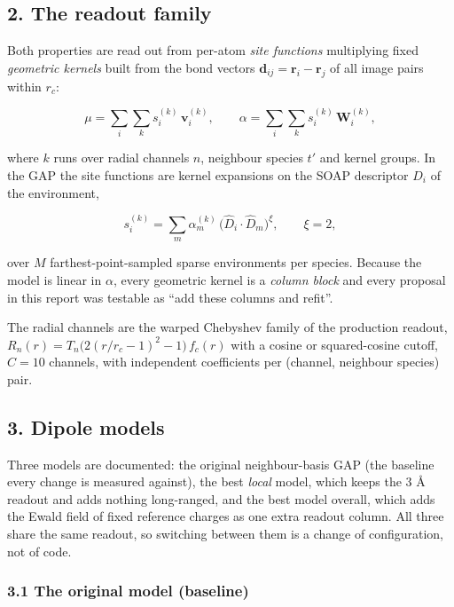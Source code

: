 \documentclass[
  10pt,
]{article}
\begin{document}
\subsection{2. The readout family}\label{the-readout-family}

Both properties are read out from per-atom \emph{site functions} multiplying fixed \emph{geometric
kernels} built from the bond vectors \(\mathbf d_{ij} = \mathbf r_i-\mathbf r_j\) of all image pairs
within \(r_c\):

\[
\mu = \sum_i \sum_k s^{(k)}_i\, \mathbf v^{(k)}_i, \qquad
\alpha = \sum_i \sum_k s^{(k)}_i\, \mathbf W^{(k)}_i ,
\]

where \(k\) runs over radial channels \(n\), neighbour species \(t'\) and kernel groups. In the GAP
the site functions are kernel expansions on the SOAP descriptor \(D_i\) of the environment,

\[
s^{(k)}_i = \sum_m \alpha^{(k)}_m\,\big(\hat D_i\cdot\hat D_m\big)^{\xi}, \qquad \xi = 2,
\]

over \(M\) farthest-point-sampled sparse environments per species. Because the model is linear in
\(\alpha\), every geometric kernel is a \emph{column block} and every proposal in this report was
testable as ``add these columns and refit''.

The radial channels are the warped Chebyshev family of the production readout,
\(R_n(r) = T_n\!\big(2(r/r_c-1)^2-1\big)\,f_c(r)\) with a cosine or squared-cosine cutoff,
\(C = 10\) channels, with independent coefficients per (channel, neighbour species) pair.

\subsection{3. Dipole models}\label{dipole-models}

Three models are documented: the original neighbour-basis GAP (the baseline every change is measured
against), the best \emph{local} model, which keeps the 3 \AA{} readout and adds nothing long-ranged,
and the best model overall, which adds the Ewald field of fixed reference charges as one extra
readout column. All three share the same readout, so switching between them is a change of
configuration, not of code.

\subsubsection{3.1 The original model (baseline)}\label{the-original-model-baseline}
\end{document}
